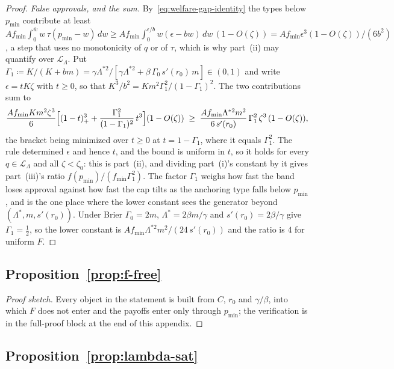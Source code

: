 \documentclass[acmsmall,nonacm,screen]{acmart}
\theoremstyle{acmplain}%
\theoremstyle{acmdefinition}%
\numberwithin{equation}{section}
\newcommand{\suppsec}[1]{the full-proof block at the end of this appendix}
\begin{document}
\begin{appendix}
\begin{proof}
\emph{False approvals, and the sum.} By~\eqref{eq:welfare-gap-identity} the types below $p_{\min}$ contribute at least $Af_{\min}\int_0^{\bar w}w\,\tau(p_{\min}-w)\,dw\geq Af_{\min}\int_0^{\epsilon/b}w(\epsilon-bw)\,dw\,(1-O(\zeta))=Af_{\min}\epsilon^3(1-O(\zeta))/(6b^2)$, a step that uses no monotonicity of $q$ or of $\tau$, which is why part~(ii) may quantify over $\mathcal{L}_\Lambda$. Put $\Gamma_1\coloneqq K/(K+bm)=\gamma\Lambda^{*2}/[\gamma\Lambda^{*2}+\beta\,\Gamma_0\,s'(r_0)\,m]\in(0,1)$ and write $\epsilon=tK\zeta$ with $t\geq0$, so that $K^3/b^2=Km^2\Gamma_1^2/(1-\Gamma_1)^2$. The two contributions sum to
\[
\frac{Af_{\min}Km^2\zeta^3}{6}\Bigl[(1-t)_+^3+\frac{\Gamma_1^2}{(1-\Gamma_1)^2}\,t^3\Bigr](1-O(\zeta))\;\geq\;\frac{Af_{\min}\Lambda^{*2}m^2}{6\,s'(r_0)}\,\Gamma_1^2\,\zeta^3\,(1-O(\zeta)),
\]
the bracket being minimized over $t\geq0$ at $t=1-\Gamma_1$, where it equals $\Gamma_1^2$. The rule determined $\epsilon$ and hence $t$, and the bound is uniform in $t$, so it holds for every $q\in\mathcal{L}_\Lambda$ and all $\zeta<\zeta_0$: this is part~(ii), and dividing part~(i)'s constant by it gives part~(iii)'s ratio $f(p_{\min})/(f_{\min}\Gamma_1^2)$. The factor $\Gamma_1$ weighs how fast the band loses approval against how fast the cap tilts as the anchoring type falls below $p_{\min}$, and is the one place where the lower constant sees the generator beyond $(\Lambda^*,m,s'(r_0))$. Under Brier $\Gamma_0=2m$, $\Lambda^*=2\beta m/\gamma$ and $s'(r_0)=2\beta/\gamma$ give $\Gamma_1=\tfrac12$, so the lower constant is $Af_{\min}\Lambda^{*2}m^2/(24\,s'(r_0))$ and the ratio is $4$ for uniform $F$.
\end{proof}

\subsection{Proposition~\ref{prop:f-free}}\label{app:f-free}

\begin{proof}[Proof sketch]
Every object in the statement is built from $C$, $r_0$ and $\gamma/\beta$, into which $F$ does not enter and the payoffs enter only through $p_{\min}$; the verification is in \suppsec{S.6}.
\end{proof}

\subsection{Proposition~\ref{prop:lambda-sat}}\label{app:lambda-sat}


\end{appendix}
\end{document}
